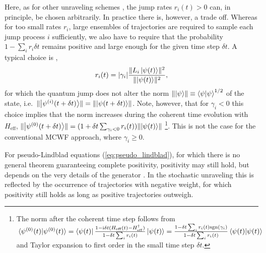 \documentclass[twocolumn,prl,superscriptaddress]{revtex4-2}
\renewcommand{\i}{\mathrm i}
\begin{document}
Here, as for other unraveling schemes \cite{IKondovMschreiber2003}, the jump rates $r_i(t) > 0$ can, in principle, be chosen arbitrarily. In practice there is, however, a trade off. Whereas for too small rates $r_i$, large ensembles of trajectories are required to sample each jump process $i$ sufficiently, we also have to require that the probability $1- \sum_i r_i\delta t$ remains positive and large enough for the given time step $\delta t$. A typical choice is \cite{ADaley2014},
\begin{align}
	r_i(t) = |\gamma_i| \frac{\lVert L_i \ket{\psi (t)} \rVert^2}{\lVert \ket{\psi(t)} \rVert^2},
	\label{eq:jump_prob}
\end{align} 
for which the quantum jump does not alter the norm $\lVert \ket \psi \rVert\equiv \braket{\psi}^{1/2}$ of the state, i.e.~$\lVert \ket{\psi^{(i)}(t+\delta t)} \rVert = \lVert \ket{\psi(t+\delta t)}\rVert$. Note, however, that for $\gamma_i<0$ this choice implies that the norm increases during the coherent time evolution with $H_\mathrm{eff}$,  $\lVert \ket{\psi^{(0)}(t+\delta t)} \rVert = (1 + \delta t \sum_{\gamma_i<0} r_i(t))  \lVert \ket{\psi(t)} \rVert$ \footnote{The norm after the coherent time step follows from $\braket*{\psi^{(0)}(t)} = \bra{\psi(t)} \frac{1-\i \delta t (H_\mathrm{eff}(t) - H_\mathrm{eff}^\dagger)}{1-\delta t \sum_i r_i(t)} \ket{\psi(t)} = \frac{1-\delta t \sum_i r_i(t) \mathrm{sgn}(\gamma_i)}{1-\delta t \sum_i r_i(t)} \braket{\psi(t)} $ and Taylor expansion to first order in the small time step $\delta t$. }. This is not the case for the conventional MCWF approach, where $\gamma_i\ge0$.

For pseudo-Lindblad equations (\ref{eq:pseudo_lindblad}), for which there is no general theorem guaranteeing complete positivity, positivity may still hold, but depends on the very details of the generator \cite{GLindblad1976,GoriniKossakowski1976,AShajiECGSudarshan2005}. In the stochastic unraveling this is reflected by the occurrence of trajectories with negative weight, for which positivity still holds as long as positive trajectories outweigh.
\end{document}
